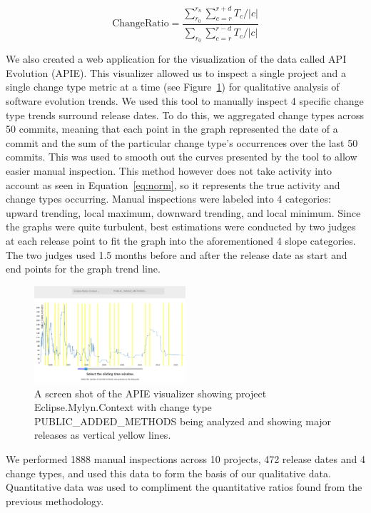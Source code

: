 \documentclass{sig-alternate}
\begin{document}
\begin{equation}
\text{ChangeRatio} = \frac{ \sum_{r_0}^{r_n}\sum_{c=r}^{r+d} T_c / |c|} { \sum_{r_0}\sum_{c=r}^{r-d} T_c / |c|}
\label{eq:norm}
\end{equation}

We also created a web application for the visualization of the data called API Evolution (APIE). This visualizer allowed
us to inspect a single project and a single change type metric at a time (see Figure~\ref{fig:apie}) for qualitative analysis of software evolution trends. We
used this tool to manually inspect 4 specific change type trends surround release dates. To do this, we aggregated change types across 50 commits, meaning that
each point in the graph represented the date of a commit and the sum of the particular change type's occurrences over the last 50 commits. This was used to smooth
out the curves presented by the tool to allow easier manual inspection. This method however does not take activity into account as seen in
Equation~\ref{eq:norm}, so it represents the true activity and change types occurring. Manual inspections were labeled into 4 categories: upward trending, local maximum, downward
trending, and local minimum. Since the graphs were quite turbulent, best estimations were conducted by two judges at each release point to fit the graph into the aforementioned
4 slope categories. The two judges used 1.5 months before and after the release date as start and end points for the graph trend line.

\begin{figure}[tb!]
\centering
\includegraphics[width=0.5\textwidth]{images/apie.png}
\caption{A screen shot of the APIE visualizer showing project Eclipse.Mylyn.Context with change type PUBLIC\_ADDED\_METHODS being analyzed and showing
major releases as vertical yellow lines.\label{fig:apie}}
\end{figure}

We performed 1888 manual inspections across 10 projects, 472 release dates and 4 change types, and used this data to form the basis of our qualitative data.
Quantitative data was used to compliment the quantitative ratios found from the previous methodology. 
\end{document}
